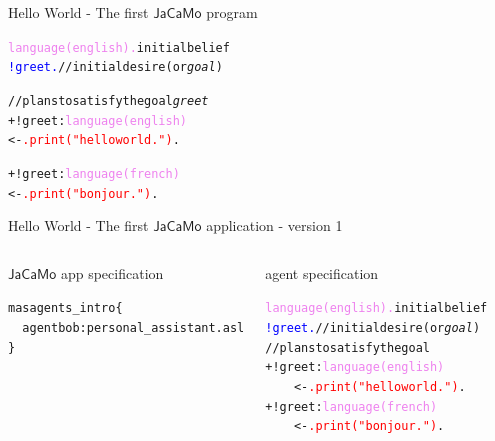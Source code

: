 \documentclass[compress]{beamer}
\newcommand{\jacamo}{$\mathsf{JaCaMo}$\xspace}
\newcommand{\planhead}[1]{\textcolor{indiagreen}{#1}}
\newcommand{\desire}[1]{\textcolor{blue}{#1}}
\newcommand{\instruction}[1]{\textcolor{red}{#1}}
\newcommand{\comment}[1]{\textcolor{harvestgold}{#1}}
\newcommand{\belief}[1]{\textcolor{violet}{#1}}
\begin{document}
\begin{frame}[fragile]{Hello World - The first \jacamo program}

\begin{alltt}
   
   \belief{language(english).} \comment{initial belief}
   \desire{!greet.} \comment{//initial desire (or \textit{goal})}
   
   \comment{//plans to satisfy the goal \textit{greet}} 
   \planhead{+!greet} : \belief{language(english)}
       <- \instruction{.print("hello world.")}.
    
   \planhead{+!greet} : \belief{language(french)} 
       <- \instruction{.print("bonjour.")}.    
\end{alltt}
\end{frame}

\begin{frame}{Hello World - The first \jacamo application - version 1}
%
%
 \begin{columns}
   

     \begin{block}{\jacamo app specification}
     \begin{alltt}\scriptsize
        mas agents\_intro \{\\
        \ \ agent bob: personal\_assistant.asl
      \}      
      \ \\
      \ \\
      \ \\
      \ \\
      \ \\
      \ \\
      \ \\
     \end{alltt}
     \end{block}

     \begin{block}{agent specification}
      \scriptsize
      \begin{alltt}
         \belief{language(english).} \comment{initial belief}\\
         \desire{!greet.} \comment{//initial desire (or \textit{goal})}\\

         \comment{//plans to satisfy the goal}  \\
         \planhead{+!greet} : \belief{language(english)} \\
         \ \ \ \ <- \instruction{.print("hello world.")}.\\
    
         \planhead{+!greet} : \belief{language(french)} \\
         \ \ \ \ <- \instruction{.print("bonjour.")}.    
      \end{alltt}
     \end{block}
     
 \end{columns}

\end{frame}
\end{document}
